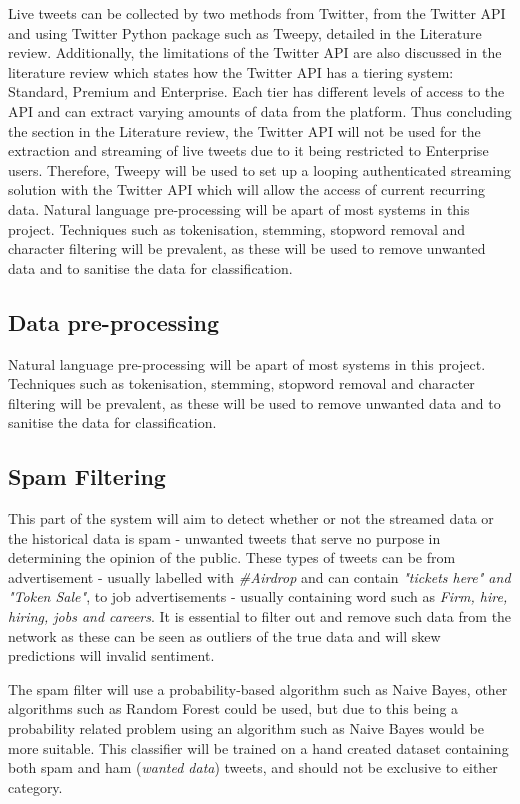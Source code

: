\documentclass[oneside, 12pt]{article}
\begin{document}
		Live tweets can be collected by two methods from Twitter, from the Twitter API and using Twitter Python package such as Tweepy, detailed in the Literature review. Additionally, the limitations of the Twitter API are also discussed in the literature review which states how the Twitter API has a tiering system: Standard, Premium and Enterprise. Each tier has different levels of access to the API and can extract varying amounts of data from the platform. Thus concluding the section in the Literature review, the Twitter API will not be used for the extraction and streaming of live tweets due to it being restricted to Enterprise users. Therefore, Tweepy will be used to set up a looping authenticated streaming solution with the Twitter API which will allow the access of current recurring data. Natural language pre-processing will be apart of most systems in this project. Techniques such as tokenisation, stemming, stopword removal and character filtering will be prevalent, as these will be used to remove unwanted data and to sanitise the data for classification.
		
		\subsection{Data pre-processing}
		Natural language pre-processing will be apart of most systems in this project. Techniques such as tokenisation, stemming, stopword removal and character filtering will be prevalent, as these will be used to remove unwanted data and to sanitise the data for classification.
		
		\subsection{Spam Filtering}
		This part of the system will aim to detect whether or not the streamed data or the historical data is spam - unwanted tweets that serve no purpose in determining the opinion of the public. These types of tweets can be from advertisement - usually labelled with \textit{\#Airdrop} and can contain \textit{"tickets here" and "Token Sale"}, to job advertisements - usually containing word such as \textit{Firm, hire, hiring, jobs and careers}. It is essential to filter out and remove such data from the network as these can be seen as outliers of the true data and will skew predictions will invalid sentiment.
		
		The spam filter will use a probability-based algorithm such as Naive Bayes, other algorithms such as Random Forest could be used, but due to this being a probability related problem using an algorithm such as Naive Bayes would be more suitable. This classifier will be trained on a hand created dataset containing both spam and ham (\textit{wanted data}) tweets, and should not be exclusive to either category.
		
\end{document}
